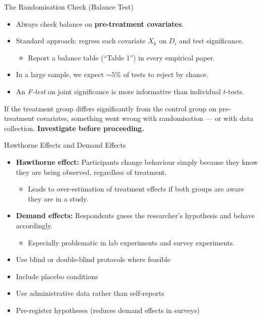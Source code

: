 \documentclass[aspectratio=169, 11pt]{beamer}
\begin{document}
\begin{frame}[t]{The Randomisation Check (Balance Test)}
\begin{itemize}
  \setlength\itemsep{0.5em}
  \item Always check balance on \textbf{pre-treatment covariates}.
  \item Standard approach: regress each covariate $X_k$ on $D_i$ and test significance.
    \begin{itemize}
      \item Report a balance table (``Table 1'') in every empirical paper.
    \end{itemize}
  \item In a large sample, we expect $\sim5\%$ of tests to reject by chance.
  \item An \emph{F-test} on joint significance is more informative than individual $t$-tests.
\end{itemize}
\vspace{0.3em}
\begin{warningbox}
If the treatment group differs significantly from the control group on
pre-treatment covariates, something went wrong with randomisation —
or with data collection. \textbf{Investigate before proceeding.}
\end{warningbox}
\end{frame}

\begin{frame}[t]{Hawthorne Effects and Demand Effects}
\begin{itemize}
  \setlength\itemsep{0.5em}
  \item \textbf{Hawthorne effect:} Participants change behaviour simply because
        they know they are being observed, regardless of treatment.
    \begin{itemize}
      \item Leads to over-estimation of treatment effects if both groups are
            aware they are in a study.
    \end{itemize}
  \item \textbf{Demand effects:} Respondents guess the researcher's hypothesis
        and behave accordingly.
    \begin{itemize}
      \item Especially problematic in lab experiments and survey experiments.
    \end{itemize}
\end{itemize}
\vspace{0.3em}
\begin{intuitionbox}
  \small
  \begin{itemize}
    \item Use blind or double-blind protocols where feasible
    \item Include placebo conditions
    \item Use administrative data rather than self-reports
    \item Pre-register hypotheses (reduces demand effects in surveys)
  \end{itemize}
\end{intuitionbox}
\end{frame}
\end{document}
